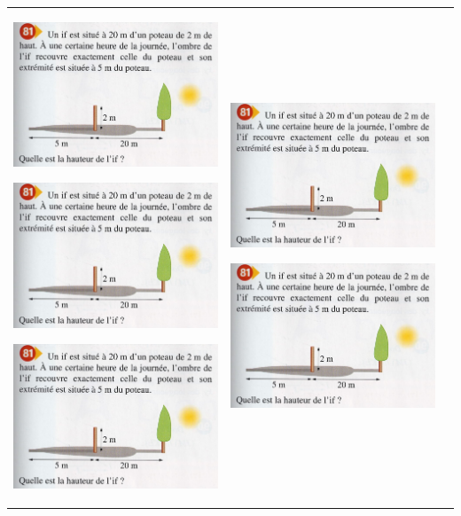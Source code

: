 \documentclass[12pt, twoside]{article}
\begin{document}
\begin{landscape}
\begin{tabular}{ccc}
\begin{minipage}{8cm}
\includegraphics[width=7cm]{images/ex81.jpg}



\includegraphics[width=7cm]{images/ex81.jpg}


\includegraphics[width=7cm]{images/ex81.jpg}
\end{minipage}
&
\begin{minipage}{8cm}
\includegraphics[width=7cm]{images/ex81.jpg}




\includegraphics[width=7cm]{images/ex81.jpg}




\end{minipage}
\end{tabular}
\end{landscape}
\end{document}
